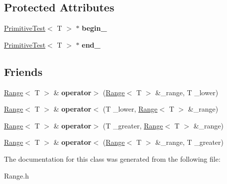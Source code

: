\subsection*{Protected Attributes}
\begin{DoxyCompactItemize}
\item 
\mbox{\label{class_range_ad0c538b07b483db50faaf728cf3fd72b}} 
\hyperlink{class_primitive_test}{Primitive\+Test}$<$ T $>$ $\ast$ {\bfseries begin\+\_\+}
\item 
\mbox{\label{class_range_a5c057e464e0dc930245b123369c2c1ea}} 
\hyperlink{class_primitive_test}{Primitive\+Test}$<$ T $>$ $\ast$ {\bfseries end\+\_\+}
\end{DoxyCompactItemize}
\subsection*{Friends}
\begin{DoxyCompactItemize}
\item 
\mbox{\label{class_range_a13a243c96bb300c01fe9842da0e9dfda}} 
\hyperlink{class_range}{Range}$<$ T $>$ \& {\bfseries operator$>$} (\hyperlink{class_range}{Range}$<$ T $>$ \&\+\_\+range, T \+\_\+lower)
\item 
\mbox{\label{class_range_a69fd53e9c8f9af069f9ab99be90b87a0}} 
\hyperlink{class_range}{Range}$<$ T $>$ \& {\bfseries operator$<$} (T \+\_\+lower, \hyperlink{class_range}{Range}$<$ T $>$ \&\+\_\+range)
\item 
\mbox{\label{class_range_a76bb66c47ced37fe31ff78c8ac227890}} 
\hyperlink{class_range}{Range}$<$ T $>$ \& {\bfseries operator$>$} (T \+\_\+greater, \hyperlink{class_range}{Range}$<$ T $>$ \&\+\_\+range)
\item 
\mbox{\label{class_range_a633d4f94f44b3bb09a3214ce91ace3ae}} 
\hyperlink{class_range}{Range}$<$ T $>$ \& {\bfseries operator$<$} (\hyperlink{class_range}{Range}$<$ T $>$ \&\+\_\+range, T \+\_\+greater)
\end{DoxyCompactItemize}


The documentation for this class was generated from the following file\+:\begin{DoxyCompactItemize}
\item 
Range.\+h\end{DoxyCompactItemize}
